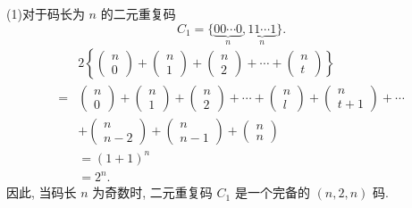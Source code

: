 \begin{tcolorbox}[breakable,colback=blue!5!white,colframe=blue!75!black,
 title= 解答题]
(1)对于码长为 $ n $ 的二元重复码
$$
C_{1}=\{\underbrace{00 \cdots 0}_{n}, \underbrace{11 \cdots 1}_{n}\} .
$$
$$
\begin{aligned}
&2\left\{\left(\begin{array}{l}
n \\
0
\end{array}\right)+\left(\begin{array}{l}
n \\
1
\end{array}\right)+\right.  \left.\left(\begin{array}{l}
n \\
2
\end{array}\right)+\cdots+\left(\begin{array}{l}
n \\
t
\end{array}\right)\right\} \\
= & \left(\begin{array}{l}
n \\
0
\end{array}\right)+\left(\begin{array}{l}
n \\
1
\end{array}\right)+\left(\begin{array}{l}
n \\
2
\end{array}\right)+\cdots+\left(\begin{array}{c}
n \\
l
\end{array}\right)+\left(\begin{array}{c}
n \\
t+1
\end{array}\right)+\cdots \\
& +\left(\begin{array}{c}
n \\
n-2
\end{array}\right)+\left(\begin{array}{c}
n \\
n-1
\end{array}\right)+\left(\begin{array}{l}
n \\
n
\end{array}\right) \\
& =(1+1)^{n} \\
& =2^{n} .
\end{aligned}
$$
因此, 当码长 $ n $ 为奇数时, 二元重复码 $ C_{1} $ 是一个完备的 $ (n, 2, n) $ 码.


\end{tcolorbox}
